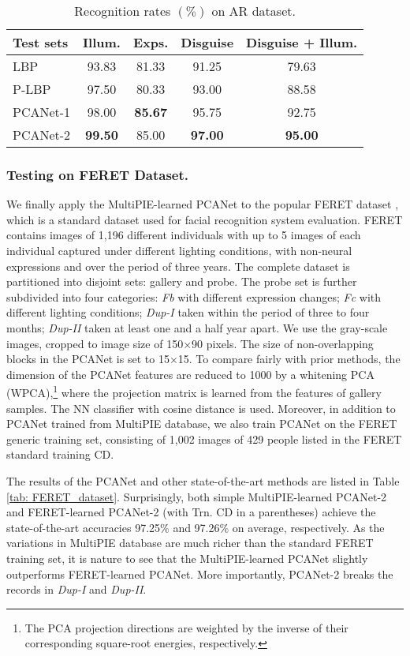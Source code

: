 \documentclass[10pt,journal,compsoc]{IEEEtran}
\begin{document}
\begin{table}\centering
\caption{Recognition rates $(\%)$ on AR dataset.}
\begin{tabular}{l|c|c|c|c}
  \hline
Test sets & Illum. & Exps.  & Disguise  & Disguise + Illum.  \\ \hline \hline
  LBP \cite{Ahonen2006} & 93.83 & 81.33 & 91.25 & 79.63 \\
  P-LBP \cite{Tan2010}    & 97.50 & 80.33 & 93.00 & 88.58 \\ \hline
PCANet-1   & 98.00 & {\bf 85.67} & 95.75 & 92.75 \\
  PCANet-2   & {\bf 99.50} & 85.00 & {\bf 97.00} & {\bf 95.00}  \\
  \hline
\end{tabular}\label{tab: AR_dataset}
\end{table}

\subsubsection{Testing on FERET Dataset.}\label{sec: FERET}
We finally apply the MultiPIE-learned PCANet to the popular FERET dataset \cite{Jonathon1998}, which is a standard dataset used for facial recognition system evaluation. FERET contains images of 1,196 different individuals with up to 5 images of each individual captured under different lighting conditions, with non-neural expressions and over the period of three years. The complete dataset is partitioned into disjoint sets: gallery and probe. The probe set is further subdivided into four categories: {\it Fb} with different expression changes; {\it Fc} with different lighting conditions; {\it Dup-I} taken within the period of three to four months; {\it Dup-II} taken at least one and a half year apart. We use the gray-scale images, cropped to image size of 150$\times$90 pixels. The size of non-overlapping blocks in the PCANet is set to {15$\times$15}. To compare fairly with prior methods, the dimension of the PCANet features are reduced to 1000 by a whitening PCA (WPCA),\footnote{The PCA projection directions are weighted by the inverse of their corresponding square-root energies, respectively.} where the projection matrix is learned from the features of gallery samples. The NN classifier with cosine distance is used. Moreover, in addition to PCANet trained from MultiPIE database, we also train PCANet on the FERET generic training set, consisting of 1,002 images of 429 people listed in the FERET standard training CD.

{
The results of the PCANet and other state-of-the-art methods are listed in Table \ref{tab: FERET_dataset}. Surprisingly, both simple MultiPIE-learned PCANet-2 and FERET-learned PCANet-2 (with Trn. CD in a parentheses) achieve the state-of-the-art accuracies 97.25$\%$ and 97.26$\%$ on average, respectively. As the variations in MultiPIE database are much richer than the standard FERET training set, it is nature to see that the MultiPIE-learned PCANet slightly outperforms FERET-learned PCANet. More importantly, PCANet-2 breaks the records in {\it Dup-I} and {\it Dup-II}.
}
\end{document}
